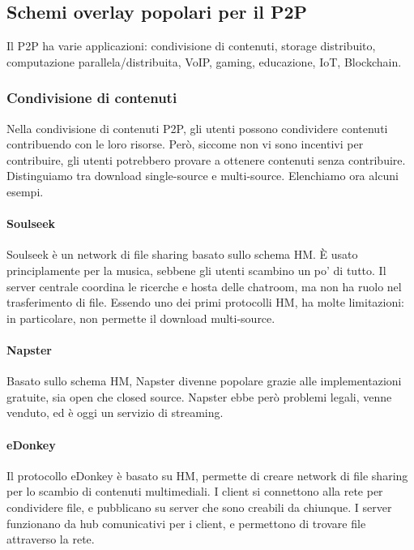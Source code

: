 \documentclass[11pt]{article}
\begin{document}
\subsection{Schemi overlay popolari per il P2P}
Il P2P ha varie applicazioni: condivisione di contenuti, storage distribuito, computazione parallela/distribuita, VoIP, gaming, educazione, IoT, Blockchain.
\subsubsection{Condivisione di contenuti}
Nella condivisione di contenuti P2P, gli utenti possono condividere contenuti contribuendo con le loro risorse. Però, siccome non vi sono incentivi per contribuire, gli utenti potrebbero provare a ottenere contenuti senza contribuire. Distinguiamo tra download single-source e multi-source. Elenchiamo ora alcuni esempi.
\paragraph{Soulseek} Soulseek è un network di file sharing basato sullo schema HM. È usato principlamente per la musica, sebbene gli utenti scambino un po' di tutto. Il server centrale coordina le ricerche e hosta delle chatroom, ma non ha ruolo nel trasferimento di file. Essendo uno dei primi protocolli HM, ha molte limitazioni: in particolare, non permette il download multi-source.

\paragraph{Napster} Basato sullo schema HM, Napster divenne popolare grazie alle implementazioni gratuite, sia open che closed source. Napster ebbe però problemi legali, venne venduto, ed è oggi un servizio di streaming.

\paragraph{eDonkey} Il protocollo eDonkey è basato su HM, permette di creare network di file sharing per lo scambio di contenuti multimediali. I client si connettono alla rete per condividere file, e pubblicano su server che sono creabili da chiunque. I server funzionano da hub comunicativi per i client, e permettono di trovare file attraverso la rete. 
\end{document}
